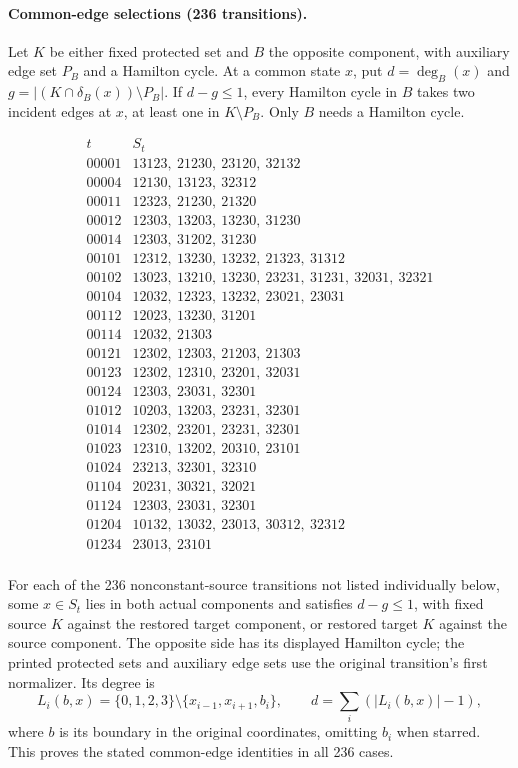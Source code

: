 \paragraph{Common-edge selections (236 transitions).}
Let $K$ be either fixed protected set and $B$ the opposite component,
with auxiliary edge set $P_B$ and a Hamilton cycle. At a common state $x$, put
$d=\deg_B(x)$ and $g=|(K\cap\delta_B(x))\setminus P_B|$.
If $d-g\le1$, every Hamilton cycle in $B$ takes two incident edges
at $x$, at least one in $K\setminus P_B$. Only $B$ needs a Hamilton cycle.

\[\begin{array}{c|l}t&S_t\\\hline
00001&13123,\ 21230,\ 23120,\ 32132\\
00004&12130,\ 13123,\ 32312\\
00011&12323,\ 21230,\ 21320\\
00012&12303,\ 13203,\ 13230,\ 31230\\
00014&12303,\ 31202,\ 31230\\
00101&12312,\ 13230,\ 13232,\ 21323,\ 31312\\
00102&13023,\ 13210,\ 13230,\ 23231,\ 31231,\ 32031,\ 32321\\
00104&12032,\ 12323,\ 13232,\ 23021,\ 23031\\
00112&12023,\ 13230,\ 31201\\
00114&12032,\ 21303\\
00121&12302,\ 12303,\ 21203,\ 21303\\
00123&12302,\ 12310,\ 23201,\ 32031\\
00124&12303,\ 23031,\ 32301\\
01012&10203,\ 13203,\ 23231,\ 32301\\
01014&12302,\ 23201,\ 23231,\ 32301\\
01023&12310,\ 13202,\ 20310,\ 23101\\
01024&23213,\ 32301,\ 32310\\
01104&20231,\ 30321,\ 32021\\
01124&12303,\ 23031,\ 32301\\
01204&10132,\ 13032,\ 23013,\ 30312,\ 32312\\
01234&23013,\ 23101\\
\end{array}\]


For each of the 236 nonconstant-source transitions not listed individually
below, some $x\in S_t$ lies in both actual components and satisfies
$d-g\le1$, with fixed source $K$ against the restored target component,
or restored target $K$ against the source component. The opposite side
has its displayed Hamilton cycle; the printed protected sets and auxiliary edge sets
use the original transition's first normalizer. Its degree is
\[
L_i(b,x)=\{0,1,2,3\}\setminus\{x_{i-1},x_{i+1},b_i\},\qquad
d=\sum_i(|L_i(b,x)|-1),
\]
where $b$ is its boundary in the original coordinates, omitting $b_i$
when starred. This proves the stated common-edge identities in all 236 cases.

